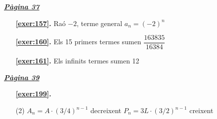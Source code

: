 
\hyperlink{page.37}{\textbf{\em Pàgina 37}}
\begin{enumerate}
\item[\fontfamily{phv}\selectfont\color{blue}\textbf{\ref{exer:157}. }] \label{ans:157} 
Raó $-2$, terme general $a_n=(-2)^n$
 \end{enumerate}
\begin{enumerate}
\item[\fontfamily{phv}\selectfont\color{blue}\textbf{\ref{exer:160}. }] \label{ans:160} 
Els 15 primers termes sumen $\dfrac {163835}{16384}$
\item[\fontfamily{phv}\selectfont\color{blue}\textbf{\ref{exer:161}. }] \label{ans:161} 
Els infinits termes sumen 12
 \end{enumerate}
\vspace{0.3cm}


\hyperlink{page.39}{\textbf{\em Pàgina 39}}
\begin{enumerate}



 \item[\fontfamily{phv}\selectfont\color{blue}\textbf{\ref{exer:199}. }] \label{ans:199}
 \begin{tasks}[column-sep=1em, item-indent=1.3333em](2)
	 \task* $A_n = A \cdot (3/4)^{n-1}$ decreixent
	 \task* $P_n = 3L \cdot (3/2)^{n-1}$ creixent
\end{tasks}
 \end{enumerate}
\vspace{0.3cm}


